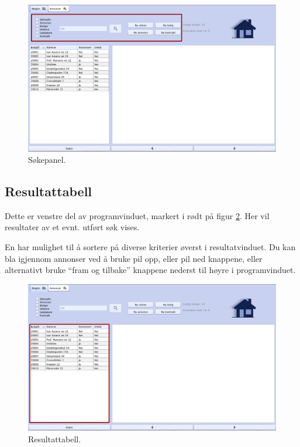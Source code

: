 \begin{figure}[h!]
 \includegraphics[width=\textwidth,height=\textheight,keepaspectratio]{./img/brukerveiledning/8.png}
 \caption{Søkepanel.}
 \label{fig:bv:8}
\end{figure}


\newpage
\subsection{Resultattabell}

Dette er venstre del av programvinduet, markert i rødt på figur \ref{fig:bv:9}. 
Her vil resultater av et evnt. utført søk vises. 

En har mulighet til å sortere på diverse kriterier øverst i resultatvinduet. Du kan bla igjennom
annonser ved å bruke pil opp, eller pil ned knappene, eller alternativt bruke “fram og tilbake”
knappene nederst til høyre i programvinduet.

\begin{figure}[h!]
 \includegraphics[width=\textwidth,height=\textheight,keepaspectratio]{./img/brukerveiledning/9.png}
 \caption{Resultattabell.}
 \label{fig:bv:9}
\end{figure}



